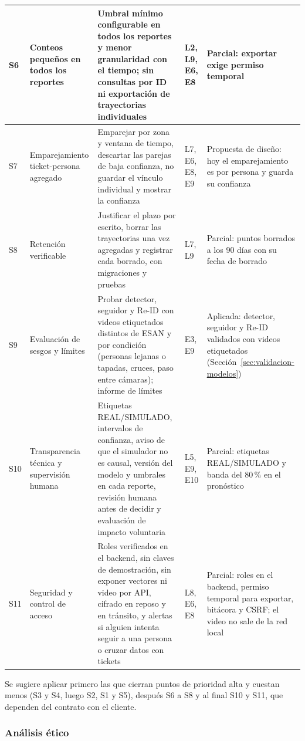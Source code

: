 \documentclass[12pt,a4paper]{article}
\begin{document}
{\begin{longtable}{|L{0.04\textwidth}|L{0.15\textwidth}|L{0.32\textwidth}|L{0.09\textwidth}|L{0.24\textwidth}|}
\hline
S6 & Conteos pequeños en todos los reportes & Umbral mínimo configurable en todos los reportes y menor granularidad con el tiempo; sin consultas por ID ni exportación de trayectorias individuales & L2, L9, E6, E8 & Parcial: exportar exige permiso temporal \\
\hline
S7 & Empareja\-miento ticket-persona agregado & Emparejar por zona y ventana de tiempo, descartar las parejas de baja confianza, no guardar el vínculo individual y mostrar la confianza & L7, E6, E8, E9 & Propuesta de diseño: hoy el emparejamiento es por persona y guarda su confianza \\
\hline
S8 & Retención verificable & Justificar el plazo por escrito, borrar las trayectorias una vez agregadas y registrar cada borrado, con migraciones y pruebas & L7, L9 & Parcial: puntos borrados a los 90 días con su fecha de borrado \\
\hline
S9 & Evaluación de sesgos y límites & Probar detector, seguidor y Re-ID con videos etiquetados distintos de ESAN y por condición (personas lejanas o tapadas, cruces, paso entre cámaras); informe de límites & E3, E9 & Aplicada: detector, seguidor y Re-ID validados con videos etiquetados (Sección~\ref{sec:validacion-modelos}) \\
\hline
S10 & Transparencia técnica y supervisión humana & Etiquetas REAL/SIMULADO, intervalos de confianza, aviso de que el simulador no es causal, versión del modelo y umbrales en cada reporte, revisión humana antes de decidir y evaluación de impacto voluntaria & L5, E9, E10 & Parcial: etiquetas REAL/SIMULADO y banda del 80\,\% en el pronóstico \\
\hline
S11 & Seguridad y control de acceso & Roles verificados en el backend, sin claves de demostración, sin exponer vectores ni video por API, cifrado en reposo y en tránsito, y alertas si alguien intenta seguir a una persona o cruzar datos con tickets & L8, E6, E8 & Parcial: roles en el backend, permiso temporal para exportar, bitácora y CSRF; el video no sale de la red local \\
\hline
\end{longtable}
}

Se sugiere aplicar primero las que cierran puntos de prioridad alta y cuestan
menos (S3 y S4, luego S2, S1 y S5), después S6 a S8 y al final S10 y S11, que
dependen del contrato con el cliente.

\FloatBarrier
\subsubsection{Análisis ético}
\end{document}
